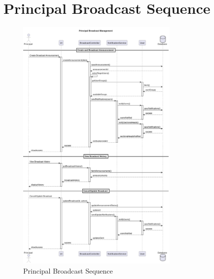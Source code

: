 \documentclass[12pt,a4paper]{report}
\begin{document}
\section{Principal Broadcast Sequence}
\begin{figure}[htbp]
    \centering
    \includegraphics[width=0.7\textwidth]{principal-broadcast-sequence.png}
    \caption{Principal Broadcast Sequence}
    \label{fig:principal-broadcast-sequence}
\end{figure}
\end{document}

